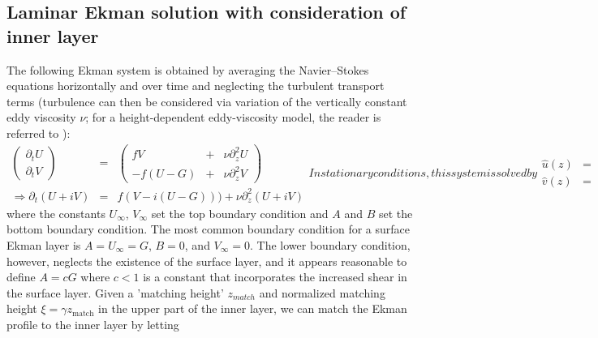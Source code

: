 \documentclass[smallcondensed,final]{svjour3}
\newcommand{\p}{\partial}
\begin{document}
\subsection{Laminar Ekman solution with consideration of inner layer}
\label{app:ekman_solution}
The following Ekman system is obtained by averaging the Navier--Stokes equations horizontally and over time and neglecting the turbulent transport terms (turbulence can then be considered via variation of the vertically constant eddy viscosity $\nu$; for a height-dependent eddy-viscosity model, the reader is referred to \cite{basu:BM2023}):
\begin{subequations}
\begin{eqnarray}
  \left(\begin{matrix}
    \p_t U\\
    \p_t V  
  \end{matrix}\right)&=&\left(\begin{matrix}
     fV &+& \nu \p_z^2 U\\ 
    -f(U-G) &+& \nu \p_z^2 V
  \end{matrix}\right)\\ 
  \Rightarrow \partial_t (U+iV) &=& f(V-i(U-G))) + \nu \p_z^2(U+iV)
\end{eqnarray}
In stationary conditions, this system is solved by
\begin{eqnarray}
  \hat{u}(z) &=& U_{\infty} + e^{-\gamma z} \left[A \cos\gamma z + B \sin\gamma z\right]   \\
  \hat{v}(z) &=& V_{\infty} + e^{-\gamma z} \left[-A \sin\gamma z + B \cos\gamma z\right]
\end{eqnarray} 
\end{subequations}
where the constants $U_\infty$, $V_\infty$ set the top boundary condition and $A$ and $B$ set the bottom boundary condition. 
%
The most common boundary condition for a surface Ekman layer is $A=U_{\infty}=G$, $B=0$, and $V_{\infty}=0$.
%
The lower boundary condition, however, neglects the existence of the surface layer, and it appears reasonable to define
$A=c G$ where $c<1$ is a constant that incorporates the increased shear in the surface layer.
%
Given a 'matching height' $z_{match}$ and normalized matching height $\xi=\gamma z_\text{match}$ in the upper part of the inner layer, we can match the Ekman profile
to the inner layer by letting
%
\end{document}
